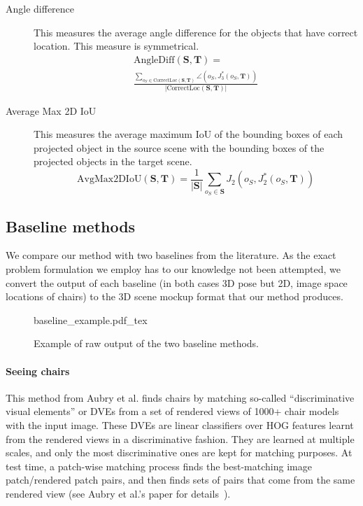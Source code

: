 \documentclass[10pt,twocolumn,letterpaper]{article}
\newcommand{\bb}[1]{{\bm{#1}}}
\begin{document}
\begin{description}
    \item[Angle difference] This measures the average angle difference for the objects that have
        correct location. This measure is symmetrical.
        \begin{multline*}
            \mathrm{AngleDiff}(\bb{S}, \bb{T}) = \\ \frac{\sum_{o_S \in \mathrm{CorrectLoc}(\bb{S}, \bb{T})} \angle(o_S, J_3^*(o_S, \bb{T}))}{|\mathrm{CorrectLoc}(\bb{S}, \bb{T})|}
        \end{multline*}
    \item[Average Max 2D IoU] This measures the average maximum IoU of the
        bounding boxes of each projected object in the source scene with the
        bounding boxes of the projected objects in the target scene.
        \[ \mathrm{AvgMax2DIoU}(\bb{S}, \bb{T}) = \frac{1}{|\bb{S}|} \sum_{o_S \in \bb{S}} J_2(o_S, J_2^*(o_S, \bb{T})) \]
\end{description}

\subsection{Baseline methods}
\label{sec:ch4:baselines}
We compare our method with two baselines from the literature. As the exact problem
formulation we employ has to our knowledge not been attempted, we convert the output
of each baseline (in both cases 3D pose but 2D, image space locations of chairs) to
the 3D scene mockup format that our method produces.

\begin{figure}[h!tb]
    \centering
    \def\svgwidth{\linewidth}
    {baseline_example.pdf_tex}
    \caption[Baseline output]{Example of raw output of the two baseline methods.}
    \label{fig:ch4:baseline_example}
\end{figure}

\paragraph{Seeing chairs~\cite{Aubry:2014:CVPR}} This method from Aubry et al. finds chairs by
matching so-called ``discriminative visual elements'' or DVEs from a set of
rendered views of 1000+ chair models with the input image. These DVEs are
linear classifiers over HOG features \cite{Dalal:2005:CVPR} learnt from the
rendered views in a discriminative fashion. They are learned at multiple scales,
and only the most discriminative ones are kept for matching purposes. At test time,
a patch-wise matching process finds the best-matching image patch/rendered patch pairs,
and then finds sets of pairs that come from the same rendered view (see Aubry et al.'s paper for details~\cite{Aubry:2014:CVPR}).
\end{document}

